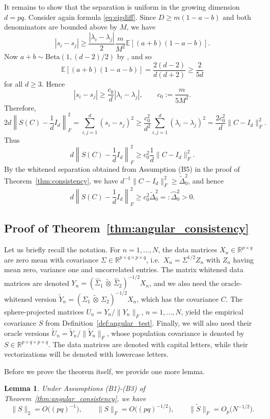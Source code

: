 \documentclass[12pt]{article}
\newcommand{\R}{\mathbb{R}}
\newcommand{\ot}{\,\tilde\otimes\,}
\newcommand{\mmle}{\widehat \Sigma_1 \ot \widehat \Sigma_2}
\newtheorem{lemma}{Lemma}
\begin{document}
    It remains to show that the separation is uniform in the growing dimension
\(d=pq\). Consider again formula \eqref{eq:eigdiff}.
Since \(D\ge m(1-a-b)\) and both denominators are bounded above by \(M\), we have
\[
|s_i-s_j|
\ge
\frac{|\lambda_i-\lambda_j|}{2}
\frac{m}{M^2}
\mathbb E[(a+b)(1-a-b)].
\]
Now \(a+b\sim \mathrm{Beta}(1,(d-2)/2)\) by \cite[Theorems 1.4 and 1.5]{FKN}, and so \cite[Theorems 1.3]{FKN}
\[
\mathbb E[(a+b)(1-a-b)]
=
\frac{2(d-2)}{d(d+2)}
\ge
\frac{2}{5d}
\]
for all \(d\ge 3\). Hence
\[
|s_i-s_j|
\ge
\frac{c_0}{d}|\lambda_i-\lambda_j|,
\qquad
c_0:=\frac{m}{5M^2}.
\]
Therefore,
\[
2d\left\|S(C)-\frac1dI_d\right\|_F^2
=
\sum_{i,j=1}^d(s_i-s_j)^2
\ge
\frac{c_0^2}{d^2}
\sum_{i,j=1}^d(\lambda_i-\lambda_j)^2
=
\frac{2c_0^2}{d}\|C-I_d\|_F^2.
\]
Thus
\[
d\left\|S(C)-\frac1dI_d\right\|_F^2
\ge
c_0^2\frac1d\|C-I_d\|_F^2.
\]
By the whitened separation obtained from Assumption (B5) in the proof of Theorem~\ref{thm:consistency}, we have
\(d^{-1}\|C-I_d\|_F^2\ge \widetilde\Delta_0^2\), and hence
\[
d\left\|S(C)-\frac1dI_d\right\|_F^2
\ge
c_0^2\widetilde\Delta_0^2
=:\wideparen\Delta_0^2>0.
\]

\subsection{Proof of Theorem~\ref{thm:angular_consistency}}

Let us briefly recall the notation. For $n=1,\ldots,N$, the data matrices $X_n \in \R^{p\times q}$ are zero mean with covariance $\Sigma \in \R^{p \times q \times p \times q}$, i.e.~$X_n = \Sigma^{1/2} Z_n$ with $Z_n$ having mean zero, variance one and uncorrelated entries. The matrix whitened data matrices are denoted $Y_n = (\mmle)^{-1/2} X_n$, and we also need the oracle-whitened version $\widetilde{Y}_n = (\Sigma_1 \ot \Sigma_2)^{-1/2} X_n$, which has the covariance $C$. The sphere-projected matrices $U_n= Y_n / \|Y_n\|_F$, $n=1,\ldots,N$, yield the empirical covariance $\widehat{S}$ from Definition~\ref{def:angular_test}. Finally, we will also need their oracle versions $\widetilde{U}_n=\widetilde{Y}_n/\|\widetilde{Y}_n\|_F$, whose population covariance is denoted by $S \in \R^{p \times q \times p \times q}$. The data matrices are denoted with capital letters, while their vectorizations will be denoted with lowercase letters.

Before we prove the theorem itself, we provide one more lemma.

\begin{lemma}\label{lem:rates}
    Under Assumptions (B1)-(B3) of Theorem~\ref{thm:angular_consistency}, we have
\[
	\|S\|_{2}=O\big((pq)^{-1}\big),
	\qquad
	\|S\|_F=O\big((pq)^{-1/2}\big),
	\qquad
	\|\widetilde S\|_F=O_p\big(N^{-1/2}\big).
\]
\end{lemma}
\end{document}
